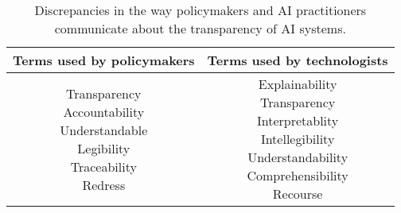 \begin{table}[h!]
\centering
\label{tab:data}
\small
\begin{tabular}{ c  c }
\toprule
{\bf Terms used by policymakers} & {\bf Terms used by technologists} \\
\midrule
\makecell{Transparency \\ Accountability \\ Understandable \\ Legibility \\ Traceability \\ Redress} & \makecell{Explainability \\ Transparency \\ Interpretablity \\ Intellegibility \\ Understandability \\ Comprehensibility \\ Recourse} \\
\bottomrule
\end{tabular}
\caption{Discrepancies in the way policymakers and AI practitioners communicate about the transparency of AI systems.}
\end{table}